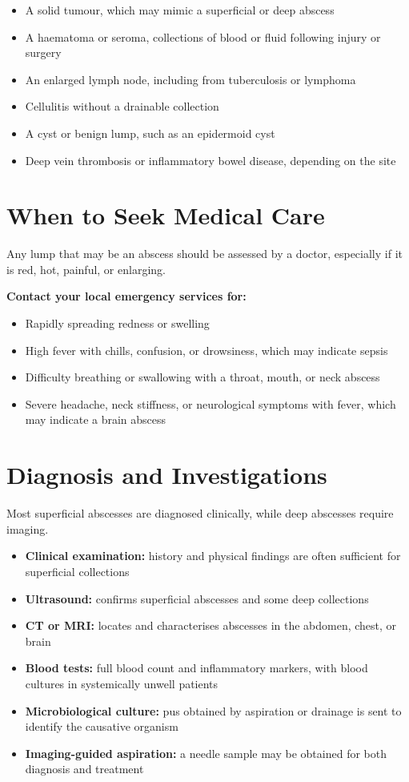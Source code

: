 \begin{itemize}
    \item A solid tumour, which may mimic a superficial or deep abscess
    \item A haematoma or seroma, collections of blood or fluid following injury or surgery
    \item An enlarged lymph node, including from tuberculosis or lymphoma
    \item Cellulitis without a drainable collection
    \item A cyst or benign lump, such as an epidermoid cyst
    \item Deep vein thrombosis or inflammatory bowel disease, depending on the site
\end{itemize}

\section*{When to Seek Medical Care}
Any lump that may be an abscess should be assessed by a doctor, especially if it is red, hot, painful, or enlarging.

\textbf{Contact your local emergency services for:}
\begin{itemize}
    \item Rapidly spreading redness or swelling
    \item High fever with chills, confusion, or drowsiness, which may indicate sepsis
    \item Difficulty breathing or swallowing with a throat, mouth, or neck abscess
    \item Severe headache, neck stiffness, or neurological symptoms with fever, which may indicate a brain abscess
\end{itemize}

\section*{Diagnosis and Investigations}
Most superficial abscesses are diagnosed clinically, while deep abscesses require imaging.

\begin{itemize}
    \item \textbf{Clinical examination:} history and physical findings are often sufficient for superficial collections
    \item \textbf{Ultrasound:} confirms superficial abscesses and some deep collections
    \item \textbf{CT or MRI:} locates and characterises abscesses in the abdomen, chest, or brain
    \item \textbf{Blood tests:} full blood count and inflammatory markers, with blood cultures in systemically unwell patients
    \item \textbf{Microbiological culture:} pus obtained by aspiration or drainage is sent to identify the causative organism
    \item \textbf{Imaging-guided aspiration:} a needle sample may be obtained for both diagnosis and treatment
\end{itemize}


